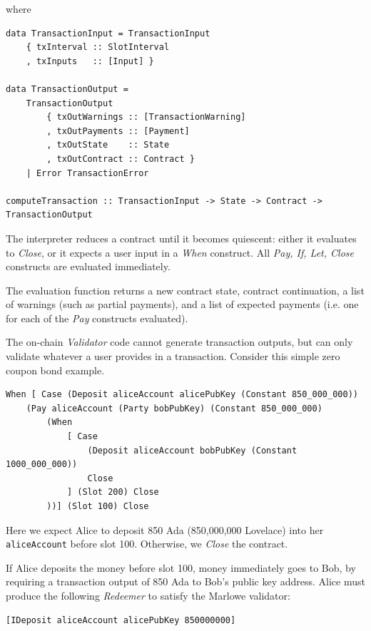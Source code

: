 \documentclass[runningheads]{llncs}
\begin{document}
\noindent
where

\begin{verbatim}
data TransactionInput = TransactionInput
    { txInterval :: SlotInterval
    , txInputs   :: [Input] }

data TransactionOutput =
    TransactionOutput
        { txOutWarnings :: [TransactionWarning]
        , txOutPayments :: [Payment]
        , txOutState    :: State
        , txOutContract :: Contract }
    | Error TransactionError

computeTransaction :: TransactionInput -> State -> Contract -> TransactionOutput
\end{verbatim}

\noindent
The interpreter reduces a contract until it becomes quiescent: either it evaluates to \emph{Close},
or it expects a user input in a \emph{When} construct.
All \emph{Pay, If, Let, Close} constructs are evaluated immediately.

The evaluation function returns a new contract state, contract continuation, a list of warnings (such as partial payments),
and a list of expected payments (i.e. one for each of the \emph{Pay} constructs evaluated).

The on-chain \emph{Validator} code cannot generate transaction outputs,
but can only validate whatever a user provides in a transaction.
Consider this simple zero coupon bond example.

\begin{verbatim}
When [ Case (Deposit aliceAccount alicePubKey (Constant 850_000_000))
    (Pay aliceAccount (Party bobPubKey) (Constant 850_000_000)
        (When
            [ Case
                (Deposit aliceAccount bobPubKey (Constant 1000_000_000))
                Close
            ] (Slot 200) Close
        ))] (Slot 100) Close
\end{verbatim}

\noindent
Here we expect Alice to deposit 850 Ada (850,000,000 Lovelace) into her \texttt{aliceAccount} before slot 100.
Otherwise, we \emph{Close} the contract.

If Alice deposits the money before slot 100, money immediately goes to Bob,
by requiring a transaction output of 850 Ada to Bob's public key address.
Alice must produce the following \emph{Redeemer} to satisfy the Marlowe validator:

\begin{verbatim}
[IDeposit aliceAccount alicePubKey 850000000]
\end{verbatim}
\end{document}

